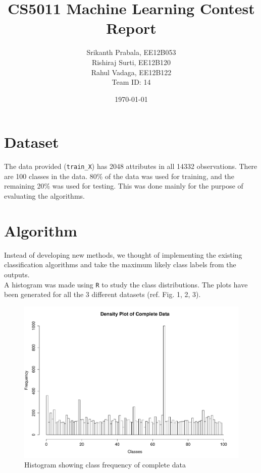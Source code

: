 \documentclass[a4paper]{article}
\title{CS5011 Machine Learning Contest Report}
\author{Srikanth Prabala, EE12B053\\
		Rishiraj Surti, EE12B120\\
		Rahul Vadaga, EE12B122\\
		Team ID: 14
		}
\date{\today}
\begin{document}
\maketitle
\section{Dataset}
The data provided (\texttt{train\_X}) has 2048 attributes in all 14332 observations. There are 100 classes in the data. 80\% of the data was used for training, and the remaining 20\% was used for testing. This was done mainly for the purpose of evaluating the algorithms. 

\section{Algorithm}
Instead of developing new methods, we thought of implementing the existing classification algorithms and take the maximum likely class labels from the outputs.\\
A histogram was made using \texttt{R} to study the class distributions. The plots have been generated for all the 3 different datasets (ref. Fig. 1, 2, 3). 
\begin{figure}[H]
	\centering
	\includegraphics[width=1\textwidth]{../plots/CompleteData_targets}
	\caption{\label{fig:data} Histogram showing class frequency of complete data}
\end{figure}
\end{document}
